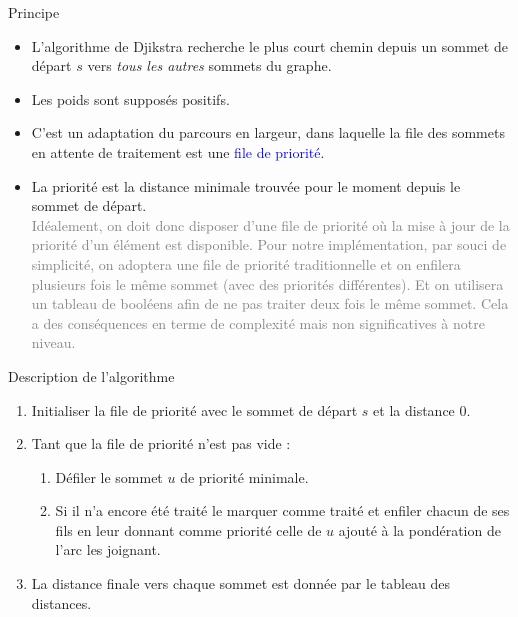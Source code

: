 \documentclass[10pt,french]{beamer}
\begin{document}
\begin{frame}[fragile]{\Ctitle}{\stitle}
	\begin{block}{Principe}
		\begin{itemize}
			\item<1-> L'algorithme de Djikstra recherche le plus court chemin depuis un sommet de départ $s$ vers \textit{tous les autres} sommets du graphe.
			\item<2-> Les poids sont supposés \textcolor{BrickRed}{positifs}.
			\item<3-> C'est un adaptation du parcours en largeur, dans laquelle la file des sommets en attente de traitement est une \textcolor{blue}{file de priorité}.
			\item<4->  La priorité est la distance minimale trouvée pour le moment depuis le sommet de départ. \\
				\textcolor{gray}{\small Idéalement, on doit donc disposer d'une file de priorité où la mise à jour de la priorité d'un élément est disponible. Pour notre implémentation, par souci de simplicité, on adoptera une file de priorité \og{} traditionnelle \fg{} et on enfilera plusieurs fois le même sommet (avec des priorités différentes). Et on utilisera un tableau de booléens afin de ne pas traiter deux fois le même sommet. Cela a des conséquences en terme de complexité mais non significatives à notre niveau.}
		\end{itemize}
	\end{block}
\end{frame}

\begin{frame}[fragile]{\Ctitle}{\stitle}
	\begin{block}{Description de l'algorithme}
		\begin{enumerate}
			\item<1-> Initialiser la file de priorité avec le sommet de départ $s$ et la distance $0$.
			\item<2-> Tant que la file de priorité n'est pas vide :
			\begin{enumerate}
				\item<3-> Défiler le sommet $u$ de priorité minimale.
				\item<4-> Si il n'a encore été traité le marquer comme traité et enfiler chacun de ses fils en leur donnant comme priorité celle de $u$ ajouté à la pondération de l'arc les joignant.
			\end{enumerate}
			\item La distance finale vers chaque sommet est donnée par le tableau des distances.
		\end{enumerate}
	\end{block}
\end{frame}
\end{document}
